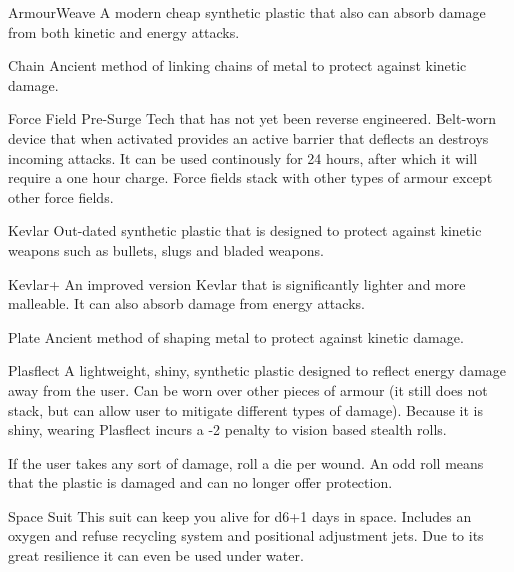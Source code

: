 \begin{multicols}{2}

\begin{genericsection}{ArmourWeave\texttrademark}
A modern cheap synthetic plastic that also can absorb damage from both kinetic and energy attacks.
\end{genericsection}

\begin{genericsection}{Chain}
Ancient method of linking chains of metal to protect against kinetic damage.
\end{genericsection}

\begin{genericsection}{Force Field}
Pre-Surge Tech that has not yet been reverse engineered. Belt-worn device that when activated provides an active barrier that deflects an destroys incoming attacks. It can be used continously for 24 hours, after which it will require a one hour charge. Force fields stack with other types of armour except other force fields.
\end{genericsection}

\begin{genericsection}{Kevlar}
Out-dated synthetic plastic that is designed to protect against kinetic weapons such as bullets, slugs and bladed weapons.
\end{genericsection}

\begin{genericsection}{Kevlar+\texttrademark}
An improved version Kevlar that is significantly lighter and more malleable. It can also absorb damage from energy attacks.
\end{genericsection}

\begin{genericsection}{Plate}
Ancient method of shaping metal to protect against kinetic damage.
\end{genericsection}

\begin{genericsection}{Plasflect\texttrademark }
A lightweight, shiny, synthetic plastic designed to reflect energy damage away from the user. Can be worn over other pieces of armour (it still does not stack, but can allow user to mitigate different types of damage). Because it is shiny, wearing Plasflect incurs a -2 penalty to vision based stealth rolls.

If the user takes any sort of damage, roll a die per wound. An odd roll means that the plastic is damaged and can no longer offer protection.
\end{genericsection}

\begin{genericsection}{Space Suit}
This suit can keep you alive for d6+1 days in space. Includes an oxygen and refuse recycling system and positional adjustment jets. Due to its great resilience it can even be used under water.
\end{genericsection}

\end{multicols}

